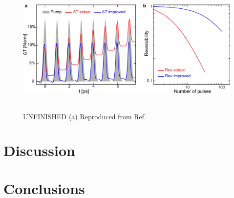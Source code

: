 \clearpage

\begin{figure}[ht]
	\centering
	\includegraphics[height=2.6in]{images/chapter_coherent/switching_reversibility}
	\caption{{\color{red}UNFINISHED} (a)  Reproduced from Ref.\ \cite{mack2019}}
\end{figure}




\section{Discussion}

\section{Conclusions}
